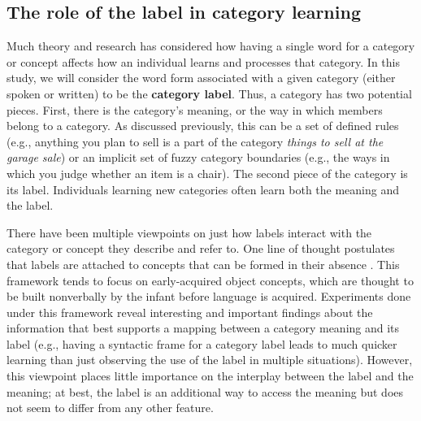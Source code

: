 \documentclass[../dissertation.tex]{subfiles}
\begin{document}
\subsection{The role of the label in category learning}
	Much theory and research has considered how having a single word for a category or concept affects how an individual learns and processes that category. In this study, we will consider the word form associated with a given category (either spoken or written) to be the \textbf{category label}. Thus, a category has two potential pieces. First, there is the category's meaning, or the way in which members belong to a category. As discussed previously, this can be a set of defined rules (e.g., anything you plan to sell is a part of the category \textit{things to sell at the garage sale}) or an implicit set of fuzzy category boundaries (e.g., the ways in which you judge whether an item is a chair). The second piece of the category is its label. Individuals learning new categories often learn both the meaning and the label. \par
	There have been multiple viewpoints on just how labels interact with the category or concept they describe and refer to. One line of thought postulates that labels are attached to concepts that can be formed in their absence \citep{Gillette1999,Snedeker2004}. This framework tends to focus on early-acquired object concepts, which are thought to be built nonverbally by the infant before language is acquired. Experiments done under this framework reveal interesting and important findings about the information that best supports a mapping between a category meaning and its label (e.g., having a syntactic frame for a category label leads to much quicker learning than just observing the use of the label in multiple situations).  However, this viewpoint places little importance on the interplay between the label and the meaning; at best, the label is an additional way to access the meaning but does not seem to differ from any other feature. \par
\end{document}
